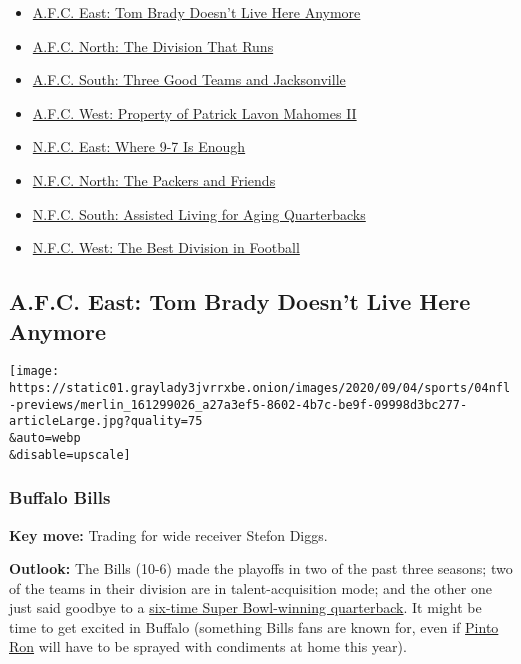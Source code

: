 \begin{itemize}
\tightlist
\item
  \protect\hyperlink{link-652486c8}{A.F.C. East: Tom Brady Doesn't Live
  Here Anymore}
\item
  \protect\hyperlink{link-3104d825}{A.F.C. North: The Division That
  Runs}
\item
  \protect\hyperlink{link-32b9b495}{A.F.C. South: Three Good Teams and
  Jacksonville}
\item
  \protect\hyperlink{link-3dfad86a}{A.F.C. West: Property of Patrick
  Lavon Mahomes II}
\item
  \protect\hyperlink{link-38ffe51b}{N.F.C. East: Where 9-7 Is Enough}
\item
  \protect\hyperlink{link-2b33199e}{N.F.C. North: The Packers and
  Friends}
\item
  \protect\hyperlink{link-12ca264c}{N.F.C. South: Assisted Living for
  Aging Quarterbacks}
\item
  \protect\hyperlink{link-cd6fbd8}{N.F.C. West: The Best Division in
  Football}
\end{itemize}

\hypertarget{afc-east-tom-brady-doesnt-live-here-anymore}{%
\subsection{A.F.C. East: Tom Brady Doesn't Live Here
Anymore}\label{afc-east-tom-brady-doesnt-live-here-anymore}}

\texttt{[image: https://static01.graylady3jvrrxbe.onion/images/2020/09/04/sports/04nfl-previews/merlin\_161299026\_a27a3ef5-8602-4b7c-be9f-09998d3bc277-articleLarge.jpg?quality=75\\\&auto=webp\\\&disable=upscale]}

\hypertarget{buffalo-bills}{%
\subsubsection{\texorpdfstring{\textbf{Buffalo
Bills}}{Buffalo Bills}}\label{buffalo-bills}}

\textbf{Key move:} Trading for wide receiver Stefon Diggs.

\textbf{Outlook:} The Bills (10-6) made the playoffs in two of the past
three seasons; two of the teams in their division are in
talent-acquisition mode; and the other one just said goodbye to a
\href{https://www.nytimes3xbfgragh.onion/2020/03/17/sports/football/tom-brady-patriots.html}{six-time
Super Bowl-winning quarterback}. It might be time to get excited in
Buffalo (something Bills fans are known for, even if
\href{https://www.buffalobills.com/news/11-questions-with-bills-superfan-pinto-ron}{Pinto
Ron} will have to be sprayed with condiments at home this year).

